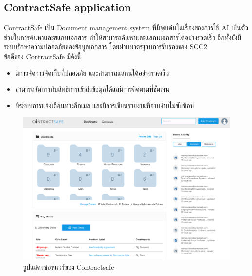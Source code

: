 \documentclass[12pt,oneside,openright,a4paper]{cpe-thai-project}
\begin{document}
\subsection{ContractSafe application}
\hspace*{1cm} ContractSafe เป็น Document management system ที่มีจุดเด่นในเรื่องของการใช้ AI เป็นตัวช่วยในการค้นหาและสแกนเอกสาร ทำให้สามารถค้นหาและแสกนเอกสารได้อย่างรวดเร็ว อีกทั้งยังมีระบบรักษาความปลอดภัยของข้อมูลเอกสาร โดยผ่านมาตรฐานการรับรองของ SOC2 \\
\hspace*{1cm} ข้อดีของ ContractSafe มีดังนี้
\begin{itemize}
  \item มีการจัดการจัดเก็บที่ปลอดภัย และสามารถแสกนได้อย่างรวดเร็ว	
  \item สามารถจัดการกับสิทธิการเข้าถึงข้อมูลได้แลมีการติดตามที่ชัดเจน
  \item มีระบบการแจ้งเตือนทางอีกเมล และมีการเขียนรายงานที่อ่านง่ายไม่ซับซ้อน
\end{itemize}

\begin{figure}[!h]\centering
  \includegraphics[width=13cm]{./assets/contractsafe.png}
  \caption{รูปแสดงซอฟแวร์ของ Contractsafe}\label{fig:contractsafe}
\end{figure}
\end{document}
